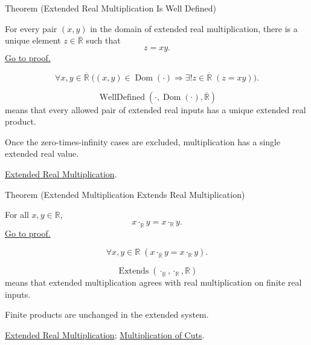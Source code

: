 \begin{theorembox}{Theorem (Extended Real Multiplication Is Well Defined)}
\begin{theorem}
\label{thm:extended-real-multiplication-well-defined}
For every pair $(x,y)$ in the domain of extended real multiplication, there is
a unique element $z\in\overline{\mathbb{R}}$ such that
\[
z=xy.
\]
\hyperref[prf:extended-real-multiplication-well-defined]{Go to proof.}
\end{theorem}
\end{theorembox}
\begin{remark*}
\[
\forall x,y\in\overline{\mathbb{R}}\;
\bigl((x,y)\in\operatorname{Dom}(\cdot)\Rightarrow
\exists!z\in\overline{\mathbb{R}}\;(z=xy)\bigr).
\]
\end{remark*}
\begin{remark*}
\[
\operatorname{WellDefined}(\cdot,\operatorname{Dom}(\cdot),\overline{\mathbb{R}})
\]
means that every allowed pair of extended real inputs has a unique extended real product.
\end{remark*}
\begin{remark*}[Interpretation]
Once the zero-times-infinity cases are excluded, multiplication has a single
extended real value.
\end{remark*}
\begin{dependencies}
\hyperref[def:extended-real-multiplication]{Extended Real Multiplication}.
\end{dependencies}

\begin{theorembox}{Theorem (Extended Multiplication Extends Real Multiplication)}
\begin{theorem}
\label{thm:extended-real-multiplication-extends-real-multiplication}
For all $x,y\in\mathbb{R}$,
\[
x\cdot_{\overline{\mathbb{R}}}y=x\cdot_{\mathbb{R}}y.
\]
\hyperref[prf:extended-real-multiplication-extends-real-multiplication]{Go to proof.}
\end{theorem}
\end{theorembox}
\begin{remark*}
\[
\forall x,y\in\mathbb{R}\;(x\cdot_{\overline{\mathbb{R}}}y=x\cdot_{\mathbb{R}}y).
\]
\end{remark*}
\begin{remark*}
\[
\operatorname{Extends}(\cdot_{\overline{\mathbb{R}}},\cdot_{\mathbb{R}},\mathbb{R})
\]
means that extended multiplication agrees with real multiplication on finite real inputs.
\end{remark*}
\begin{remark*}[Interpretation]
Finite products are unchanged in the extended system.
\end{remark*}
\begin{dependencies}
\hyperref[def:extended-real-multiplication]{Extended Real Multiplication};
\hyperref[def:multiplication-on-r]{Multiplication of Cuts}.
\end{dependencies}


